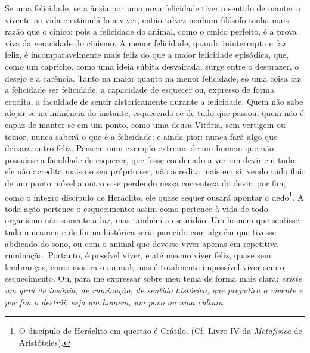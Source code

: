 Se uma felicidade, se a ânsia por uma nova felicidade tiver o sentido de
manter o vivente na vida e estimulá-lo a viver, então talvez nenhum
filósofo tenha mais razão que o cínico: pois a felicidade do animal,
como o cínico perfeito, é a prova viva da veracidade do cinismo. A menor
felicidade, quando ininterrupta e faz feliz, é incomparavelmente mais
feliz do que a maior felicidade episódica, que, como um capricho, como
uma ideia súbita desvairada, surge entre o desprazer, o desejo e a
carência. Tanto na maior quanto na menor felicidade, só uma coisa faz a
felicidade ser felicidade: a capacidade de esquecer ou, expresso de
forma erudita, a faculdade de sentir aistoricamente durante a
felicidade. Quem não sabe alojar-se na iminência do instante,
esquecendo-se de tudo que passou, quem não é capaz de manter-se em um
ponto, como uma deusa Vitória, sem vertigem ou temor, nunca saberá o que
é a felicidade; e ainda pior: nunca fará algo que deixará outro feliz.
Pensem num exemplo extremo de um homem que não possuísse a faculdade de
esquecer, que fosse condenado a ver um devir em tudo: ele não acredita
mais no seu próprio ser, não acredita mais em si, vendo tudo fluir de um
ponto móvel a outro e se perdendo nessa correnteza do devir; por fim,
como o íntegro discípulo de Heráclito, ele quase sequer ousará apontar o
dedo\footnote{O discípulo de Heráclito em questão é Crátilo. (Cf. Livro
  IV da \emph{Metafísica} de Aristóteles).}. A toda ação pertence o
esquecimento: assim como pertence à vida de todo organismo não somente a
luz, mas também a escuridão. Um homem que sentisse tudo unicamente de
forma histórica seria parecido com alguém que tivesse abdicado do sono,
ou com o animal que devesse viver apenas em repetitiva ruminação.
Portanto, é possível viver, e até mesmo viver feliz, quase sem
lembranças, como mostra o animal; mas é totalmente impossível viver sem
o esquecimento. Ou, para me expressar sobre meu tema de forma mais
clara: \emph{existe um grau de insônia, de ruminação, de sentido
histórico, que prejudica o vivente e por fim o destrói, seja um homem,
um povo ou uma cultura}.

